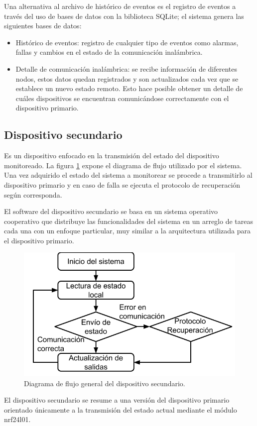 Una alternativa al archivo de histórico de eventos es el registro de eventos a través del uso de bases de datos con la biblioteca SQLite; el sistema genera las siguientes bases de datos:
\begin{itemize}
\item Histórico de eventos: registro de cualquier tipo de eventos como alarmas, fallas y cambios en el estado de la comunicación inalámbrica.
\item Detalle de comunicación inalámbrica: se recibe información de diferentes nodos, estos datos quedan registrados y son actualizados cada vez que se establece un nuevo estado remoto. Esto hace posible obtener un detalle de cuáles dispositivos se encuentran comunicándose correctamente con el dispositivo primario.    
\end{itemize}

\subsection{Dispositivo secundario}

Es un dispositivo enfocado en la transmisión del estado del dispositivo monitoreado. La figura \ref{fig:figura_disp_fl_sec} expone el diagrama de flujo utilizado por el sistema. Una vez adquirido el estado del sistema a monitorear se procede a transmitirlo al dispositivo primario y en caso de falla se ejecuta el protocolo de recuperación según corresponda.

El software del dispositivo secundario se basa en un sistema operativo cooperativo que distribuye las funcionalidades del sistema en un arreglo de tareas cada una con un enfoque particular, muy similar a la arquitectura utilizada para el dispositivo primario.

\begin{figure}[]
	\centering
	\includegraphics[scale=.35]{./Figures/Capitulo3/Fig_Fl_Sec.png}
	\caption{Diagrama de flujo general del dispositivo secundario.}
	\label{fig:figura_disp_fl_sec}
\end{figure} 

El dispositivo secundario se resume a una versión del dispositivo primario orientado únicamente a la transmisión del estado actual mediante el módulo nrf24l01.
